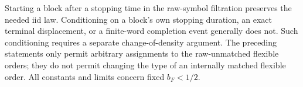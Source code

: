 \begin{remark}
\label{arm:fresh-block-scope}
Starting a block after a stopping time in the raw-symbol filtration
preserves the needed iid law.  Conditioning on a block's own stopping
duration, an exact terminal displacement, or a finite-word completion
event generally does not.  Such conditioning requires a separate
change-of-density argument.  The preceding statements only permit
arbitrary assignments to the raw-unmatched flexible orders; they do
not permit changing the type of an internally matched flexible order.
All constants and limits concern fixed $b_F<1/2$.
\end{remark}
